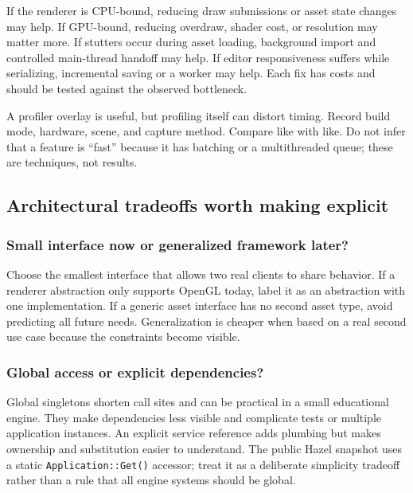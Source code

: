 If the renderer is CPU-bound, reducing draw submissions or asset state changes may help. If GPU-bound, reducing overdraw, shader cost, or resolution may matter more. If stutters occur during asset loading, background import and controlled main-thread handoff may help. If editor responsiveness suffers while serializing, incremental saving or a worker may help. Each fix has costs and should be tested against the observed bottleneck.

A profiler overlay is useful, but profiling itself can distort timing. Record build mode, hardware, scene, and capture method. Compare like with like. Do not infer that a feature is ``fast'' because it has batching or a multithreaded queue; these are techniques, not results.

\subsection{Architectural tradeoffs worth making explicit}\label{06-engine-ii-ch041-architectural-tradeoffs-worth-making-explicit}

\subsubsection{Small interface now or generalized framework later?}\label{06-engine-ii-ch041-small-interface-now-or-generalized-framework-later}

Choose the smallest interface that allows two real clients to share behavior. If a renderer abstraction only supports OpenGL today, label it as an abstraction with one implementation. If a generic asset interface has no second asset type, avoid predicting all future needs. Generalization is cheaper when based on a real second use case because the constraints become visible.

\subsubsection{Global access or explicit dependencies?}\label{06-engine-ii-ch041-global-access-or-explicit-dependencies}

Global singletons shorten call sites and can be practical in a small educational engine. They make dependencies less visible and complicate tests or multiple application instances. An explicit service reference adds plumbing but makes ownership and substitution easier to understand. The public Hazel snapshot uses a static \texttt{Application::Get()} accessor; treat it as a deliberate simplicity tradeoff rather than a rule that all engine systems should be global.

